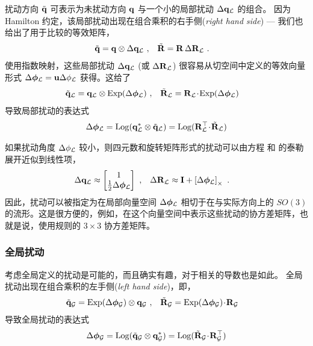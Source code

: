 扰动方向 $\tilde{{\bf q}}$ 可表示为未扰动方向 ${\bf q}$ 与一个小的局部扰动 ${\Delta{\bf q}_{\mathcal{L}}}$ 的组合。 
因为 Hamilton 约定，该局部扰动出现在组合乘积的右手侧(\emph{right hand side}) --- 我们也给出了用于比较的等效矩阵，
%
\begin{align}
\tilde{{\bf q}} &= {\bf q}\otimes{\Delta{\bf q}_{\mathcal{L}}}
~, &
\tilde{{\bf R}} &= {\bf R}\,\Delta{\bf R}_{\mathcal{L}}
~.
\end{align}%
%
使用指数映射，这些局部扰动 $\Delta{\bf q}_{\mathcal{L}}$ (或 $\Delta{\bf R}_{\mathcal{L}}$) 很容易从切空间中定义的等效向量形式 $\Delta{\bm \phi}_{\mathcal{L}}={\bf u}\Delta\phi_{\mathcal{L}}$ 获得。这给了
%
\begin{align}
\tilde{{\bf q}}_{\mathcal{L}} &= {\bf q}_{\mathcal{L}}\otimes\operatorname*{Exp}(\Delta{\bm \phi}_{\mathcal{L}})
~,& 
\tilde{{\bf R}}_{\mathcal{L}} &= {\bf R}_{\mathcal{L}}\!\cdot\!\operatorname*{Exp}(\Delta{\bm \phi}_{\mathcal{L}})
\end{align}
%
导致局部扰动的表达式 
%
\begin{align}
\Delta{\bm \phi}_{\mathcal{L}} = \operatorname*{Log}({\bf q}_{\mathcal{L}}^*\otimes\tilde{{\bf q}}_{\mathcal{L}}) = \operatorname*{Log}({\bf R}_{\mathcal{L}}^{\top}\!\cdot\!\tilde{{\bf R}}_{\mathcal{L}})
\end{align}
 

如果扰动角度 $\Delta\phi_{\mathcal{L}}$ 较小，则四元数和旋转矩阵形式的扰动可以由方程  和  的泰勒展开近似到线性项，
%
\begin{align}
{\Delta{\bf q}_{\mathcal{L}}}& \approx \begin{bmatrix}
1\\\frac{1}{2}\Delta{\bm \phi}_{\mathcal{L}}
\end{bmatrix}
~,
&
\Delta{\bf R}_{\mathcal{L}}& \approx
{\bf I}+\left[\Delta{\bm \phi}_{\mathcal{L}}\right]_\times
~.
\end{align}%
%
因此，扰动可以被指定为在局部向量空间 $\Delta{\bm \phi}_{\mathcal{L}}$ 相切于在与实际方向上的 $SO(3)$ 的流形。这是很方便的，例如，在这个向量空间中表示这些扰动的协方差矩阵，也就是说，使用规则的 $3\times 3$ 协方差矩阵。

\subsubsection{全局扰动}

考虑全局定义的扰动是可能的，而且确实有趣，对于相关的导数也是如此。 
全局扰动出现在组合乘积的左手侧(\emph{left hand side})，即，
%
%
\begin{align}
\tilde{{\bf q}}_{\mathcal{G}} &= \operatorname*{Exp}(\Delta{\bm \phi}_{\mathcal{G}})\otimes{\bf q}_{\mathcal{G}}
~,& 
\tilde{{\bf R}}_{\mathcal{G}} &= \operatorname*{Exp}(\Delta{\bm \phi}_{\mathcal{G}})\!\cdot\!{\bf R}_{\mathcal{G}}
\end{align}
%
导致全局扰动的表达式 
%
\begin{align}
\Delta{\bm \phi}_{\mathcal{G}} = \operatorname*{Log}(\tilde{{\bf q}}_{\mathcal{G}}\otimes{\bf q}_{\mathcal{G}}^*) = \operatorname*{Log}(\tilde{{\bf R}}_{\mathcal{G}}\!\cdot\!{\bf R}_{\mathcal{G}}^{\top})
\end{align}


